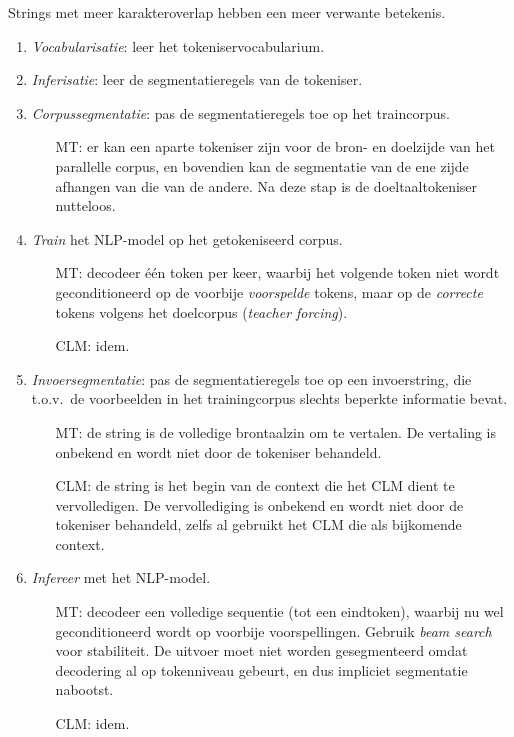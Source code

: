 \begin{mdframed}[frametitle={Grammale hypothese (GH)}, style=basic]
	Strings met meer karakteroverlap hebben een meer verwante betekenis.
\end{mdframed}


\begin{mdframed}[backgroundcolor=black!5]
\begin{enumerate}
	\item \emph{Vocabularisatie}:\footnotemark{} leer het tokeniservocabularium.
	\item \emph{Inferisatie}: leer de segmentatieregels van de tokeniser.
	\item \emph{Corpussegmentatie}: pas de segmentatieregels toe op het traincorpus. 
	\begin{itemize}
		\item[MT:] er kan een aparte tokeniser zijn voor de bron- en doelzijde van het parallelle corpus, en bovendien kan de segmentatie van de ene zijde afhangen van die van de andere. Na deze stap is de doeltaaltokeniser nutteloos.
	\end{itemize}
	
	\item \emph{Train} het NLP-model op het getokeniseerd corpus. 
	\begin{itemize}
		\item[MT:] decodeer één token per keer, waarbij het volgende token niet wordt geconditioneerd op de voorbije \textsl{voorspelde} tokens, maar op de \textsl{correcte} tokens volgens het doelcorpus (\emph*{teacher forcing}).
		\item[CLM:] idem.
	\end{itemize}
	
	\item \emph{Invoersegmentatie}: pas de segmentatieregels toe op een invoerstring, die t.o.v.\ de voorbeelden in het trainingcorpus slechts beperkte informatie bevat.
	\begin{itemize}
		\item[MT:] de string is de volledige brontaalzin om te vertalen. De vertaling is onbekend en wordt niet door de tokeniser behandeld.
		\item[CLM:] de string is het begin van de context die het CLM dient te vervolledigen. De vervollediging is onbekend en wordt niet door de tokeniser behandeld, zelfs al gebruikt het CLM die als bijkomende context.
	\end{itemize}
	
	\item \emph{Infereer} met het NLP-model.
	\begin{itemize}
		\item[MT:] decodeer een volledige sequentie (tot een eindtoken), waarbij nu wel geconditioneerd wordt op voorbije voorspellingen. Gebruik \emph{beam search} voor stabiliteit. De uitvoer moet niet worden gesegmenteerd omdat decodering al op tokenniveau gebeurt, en dus impliciet segmentatie nabootst.
		\item[CLM:] idem.
	\end{itemize}
\end{enumerate}
\end{mdframed}
